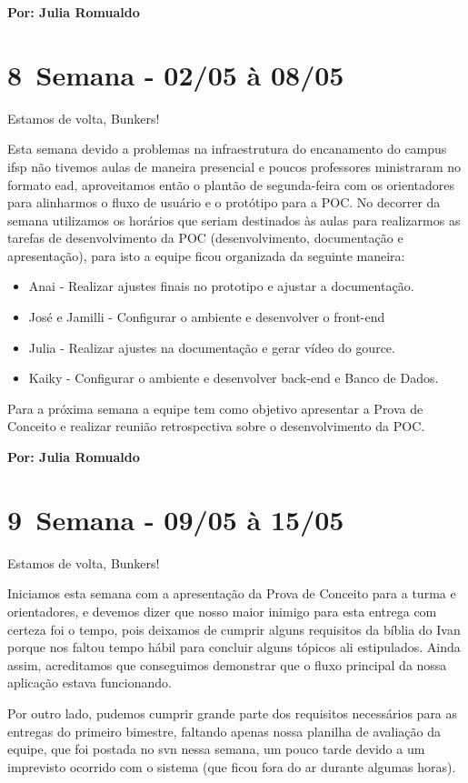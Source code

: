 \textbf{Por: Julia Romualdo}

\section{8\textordfeminine \, Semana - 02/05 à 08/05}
Estamos de volta, Bunkers!

Esta semana devido a problemas na infraestrutura do encanamento do campus \acs{ifsp} não tivemos aulas de maneira presencial e poucos professores ministraram no formato \acs{ead}, aproveitamos então o plantão de segunda-feira com os orientadores para alinharmos o fluxo de usuário e o protótipo para a \acs{POC}. No decorrer da semana utilizamos os horários que seriam destinados às aulas para realizarmos as tarefas de desenvolvimento da \acs{POC} (desenvolvimento, documentação e apresentação), para isto a equipe ficou organizada da seguinte maneira: 
\begin{itemize}
    \item Anai - Realizar ajustes finais no prototipo e ajustar a documentação.
    \item José e Jamilli - Configurar o ambiente e desenvolver o \gls{front-end}
    \item Julia - Realizar ajustes na documentação e gerar vídeo do \gls{gource}.
    \item Kaiky - Configurar o ambiente e desenvolver \gls{back-end} e Banco de Dados.
\end{itemize}
\noindent Para a próxima semana a equipe tem como objetivo apresentar a Prova de Conceito e realizar reunião retrospectiva sobre o desenvolvimento da \gls{POC}.

\textbf{Por: Julia Romualdo}

\section{9\textordfeminine \, Semana - 09/05 à 15/05}
Estamos de volta, Bunkers!

Iniciamos esta semana com a apresentação da Prova de Conceito para a turma e orientadores, e devemos dizer que nosso maior inimigo para esta entrega com certeza foi o tempo, pois deixamos de cumprir alguns requisitos da bíblia do Ivan porque nos faltou tempo hábil para concluir alguns tópicos ali estipulados. Ainda assim, acreditamos que conseguimos demonstrar que o fluxo principal da nossa aplicação estava funcionando. 

Por outro lado, pudemos cumprir grande parte dos requisitos necessários para as entregas do primeiro bimestre, faltando apenas nossa planilha de avaliação da equipe, que foi postada no \gls{svn} nessa semana, um pouco tarde devido a um imprevisto ocorrido com o sistema (que ficou fora do ar durante algumas horas). 

